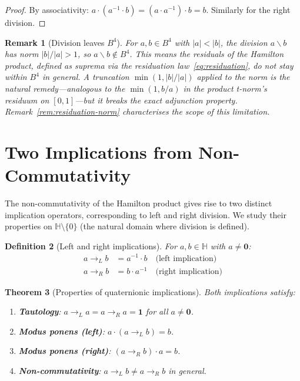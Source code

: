 \documentclass[11pt,a4paper]{article}
\newtheorem{theorem}{Theorem}
\newtheorem{definition}[theorem]{Definition}
\newtheorem{remark}[theorem]{Remark}
\newcommand{\Hq}{\mathbb{H}}
\begin{document}
\begin{proof}
By associativity: $a \cdot (a^{-1} \cdot b) = (a \cdot a^{-1}) \cdot b = b$.
Similarly for the right division.
\end{proof}

\begin{remark}[Division leaves $B^4$]
\label{rem:div-leaves}
For $a, b \in B^4$ with $|a| < |b|$, the division $a \backslash b$ has
norm $|b|/|a| > 1$, so $a \backslash b \notin B^4$. This means the
residuals of the Hamilton product, defined as suprema via the
residuation law~\eqref{eq:residuation}, do not stay within $B^4$ in
general. A truncation $\min(1, |b|/|a|)$ applied to the norm is the
natural remedy---analogous to the $\min(1, b/a)$ in the product
t-norm's residuum on $[0,1]$---but it breaks the exact adjunction
property. Remark~\ref{rem:residuation-norm} characterises the
scope of this limitation.
\end{remark}

\section{Two Implications from Non-Commutativity}
\label{sec:implications}

The non-commutativity of the Hamilton product gives rise to two distinct
implication operators, corresponding to left and right division. We
study their properties on $\Hq \setminus \{0\}$ (the natural domain
where division is defined).

\begin{definition}[Left and right implications]
\label{def:implications}
For $a, b \in \Hq$ with $a \neq \mathbf{0}$:
\begin{align}
  a \to_L b &= a^{-1} \cdot b \quad\text{(left implication)} \\
  a \to_R b &= b \cdot a^{-1} \quad\text{(right implication)}
\end{align}
\end{definition}

\begin{theorem}[Properties of quaternionic implications]
\label{thm:implications}
Both implications satisfy:
\begin{enumerate}[nosep]
\item \textbf{Tautology}: $a \to_L a = a \to_R a = \mathbf{1}$ for all
  $a \neq \mathbf{0}$.
\item \textbf{Modus ponens (left)}: $a \cdot (a \to_L b) = b$.
\item \textbf{Modus ponens (right)}: $(a \to_R b) \cdot a = b$.
\item \textbf{Non-commutativity}: $a \to_L b \neq a \to_R b$ in general.
\end{enumerate}
\end{theorem}
\end{document}
